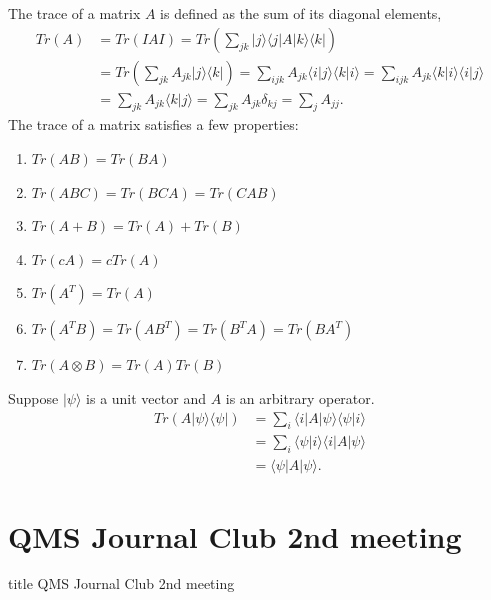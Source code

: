 \documentclass{beamer}
\begin{document}
\begin{frame}
\justify
The trace of a matrix $A$ is defined as the sum of its diagonal elements,
\begin{align}
Tr(A) & = Tr(IAI) = Tr\left(\sum_{jk} |j\rangle \langle j|A|k\rangle \langle k|\right) \nonumber \\
& = Tr\left(\sum_{jk} A_{jk} |j\rangle \langle k|\right) = \sum_{ijk} A_{jk} \langle i |j\rangle \langle k| i\rangle = \sum_{ijk} A_{jk} \langle k| i\rangle \langle i |j\rangle \nonumber \\
& = \sum_{jk} A_{jk} \langle k|j\rangle = \sum_{jk} A_{jk} \delta_{kj} = \sum_j A_{jj}.
\end{align}
\vfill
The trace of a matrix satisfies a few properties:
\begin{enumerate}
\item $Tr(AB) = Tr(BA)$
\item $Tr(ABC) = Tr(BCA) = Tr(CAB)$
\item $Tr(A+B) = Tr(A) + Tr(B)$
\item $Tr(cA) = c Tr(A)$
\item $Tr(A^T) = Tr(A)$
\item $Tr(A^TB) = Tr(AB^T) = Tr(B^TA) = Tr(BA^T)$
\item $Tr(A \otimes B) = Tr(A) Tr(B)$
\end{enumerate}
\end{frame}

\begin{frame}
\justify
Suppose $|\psi\rangle$ is a unit vector and $A$ is an arbitrary operator.
\begin{align}
Tr(A|\psi\rangle \langle\psi|) & = \sum_i \langle i|A|\psi\rangle \langle\psi|i\rangle \nonumber \\
& = \sum_i \langle\psi|i\rangle \langle i|A|\psi\rangle \nonumber \\
& = \langle\psi|A|\psi\rangle.
\end{align}
\end{frame}

\section{QMS Journal Club 2nd meeting}
\begin{frame}
\vfill
\centering
\begin{beamercolorbox}[sep=8pt,center,shadow=true,rounded=true]{title}
\Large QMS Journal Club 2nd meeting
\end{beamercolorbox}
\vfill
\end{frame}
\end{document}
